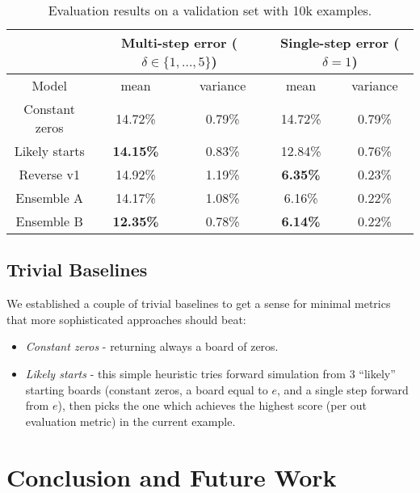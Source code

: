 \documentclass[conference]{IEEEtran}
\begin{document}
\begin{table*}[t]
    \label{results_table}
    \centering
    \begin{tabular}{|c|c|c|c|c|}
    \hline
     & \multicolumn{2}{|c|}{Multi-step error ($\delta \in \{1,\dots,5\}$)} & \multicolumn{2}{|c|}{Single-step error ($\delta = 1$)} \\
    \hline
    Model & mean & variance & mean & variance \\
    \hline
    Constant zeros & 14.72\% & 0.79\% & 14.72\% & 0.79\% \\
    Likely starts & \textbf{14.15\%} & 0.83\% & 12.84\% & 0.76\% \\
    Reverse v1 & 14.92\% & 1.19\% & \textbf{6.35\%} & 0.23\% \\
    \hline
    Ensemble A & 14.17\% & 1.08\% & 6.16\% & 0.22\% \\
    Ensemble B & \textbf{12.35\%} & 0.78\% & \textbf{6.14\%} & 0.22\% \\
    \hline
    \end{tabular}
    \caption{Evaluation results on a validation set with 10k examples.}
    \label{tab:eval_results}
\end{table*}

\subsection{Trivial Baselines}
We established a couple of trivial baselines to get a sense for minimal metrics that more sophisticated approaches should beat:
\begin{itemize}
    \item {\it Constant zeros} - returning always a board of zeros.
    \item {\it Likely starts} - this simple heuristic tries forward simulation from 3 ``likely'' starting boards (constant zeros, a board equal to $e$, and a single step forward from $e$), then picks the one which achieves the highest score (per out evaluation metric) in the current example.
\end{itemize}


\section{Conclusion and Future Work}
\end{document}
